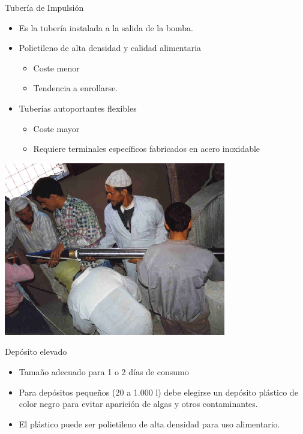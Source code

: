\documentclass[xcolor={usenames,svgnames,dvipsnames}]{beamer}
\begin{document}
\begin{frame}[label={sec:org8c2b391}]{Tubería de Impulsión}
\begin{itemize}
\item Es la tubería instalada a la salida de la bomba.

\item Polietileno de alta densidad y calidad alimentaria

\begin{itemize}
\item Coste menor

\item Tendencia a enrollarse.
\end{itemize}

\item Tuberías autoportantes flexibles

\begin{itemize}
\item Coste mayor

\item Requiere terminales específicos fabricados en acero inoxidable
\end{itemize}
\end{itemize}
\end{frame}

\begin{frame}[label={sec:org2ea2bf9}]{}
\begin{center}
\includegraphics[width=.9\linewidth]{../figs/Marruecos4.png}
\end{center}
\end{frame}


\begin{frame}[label={sec:org50649f3}]{Depósito elevado}
\begin{itemize}
\item \alert{Tamaño adecuado para 1 o 2 días de consumo}
\item Para depósitos pequeños (20 a 1.000 l) debe elegirse un \alert{depósito plástico de color negro}  para evitar aparición de algas y otros contaminantes.
\item El plástico puede ser polietileno de alta densidad para uso alimentario.
\end{itemize}
\end{frame}
\end{document}

